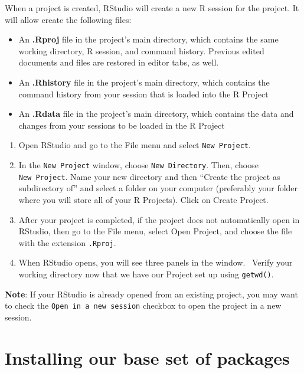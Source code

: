 \documentclass[
  letterpaper,
  DIV=11,
  numbers=noendperiod]{scrreprt}
\providecommand{\tightlist}{%
  \setlength{\itemsep}{0pt}\setlength{\parskip}{0pt}}\usepackage{longtable,booktabs,array}
\begin{document}
When a project is created, RStudio will create a new R session for the
project. It will allow create the following files:

\begin{itemize}
\tightlist
\item
  An \textbf{.Rproj} file in the project's main directory, which
  contains the same working directory, R session, and command history.
  Previous edited documents and files are restored in editor tabs, as
  well.
\item
  An \textbf{.Rhistory} file in the project's main directory, which
  contains the command history from your session that is loaded into the
  R Project
\item
  An \textbf{.Rdata} file in the project's main directory, which
  contains the data and changes from your sessions to be loaded in the R
  Project
\end{itemize}

\begin{enumerate}
\def\labelenumi{\arabic{enumi}.}
\item
  Open RStudio and go to the File menu and select \texttt{New\ Project}.
\item
  In the \texttt{New\ Project} window, choose \texttt{New\ Directory}.
  Then, choose \texttt{New\ Project}. Name your new directory and then
  ``Create the project as subdirectory of'' and select a folder on your
  computer (preferably your folder where you will store all of your R
  Projects). Click on Create Project.
\item
  After your project is completed, if the project does not automatically
  open in RStudio, then go to the File menu, select Open Project, and
  choose the file with the extension \texttt{.Rproj}.
\item
  When RStudio opens, you will see three panels in the window.~ Verify
  your working directory now that we have our Project set up using
  \texttt{getwd()}.
\end{enumerate}

\textbf{Note}: If your RStudio is already opened from an existing
project, you may want to check the \texttt{Open\ in\ a\ new\ session}
checkbox to open the project in a new session.


\hypertarget{installing-our-base-set-of-packages}{%
\chapter{Installing our base set of
packages}\label{installing-our-base-set-of-packages}}
\end{document}
